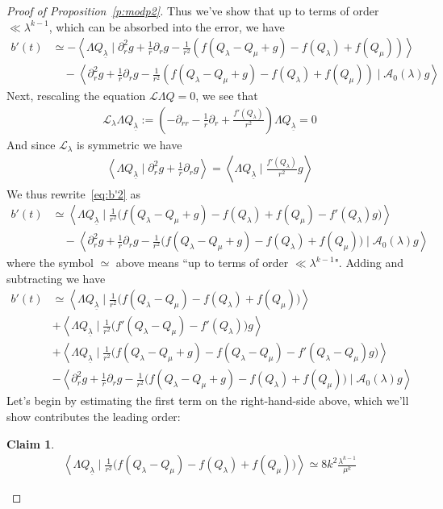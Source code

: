 \documentclass[10pt,reqno]{amsart}
\newcommand{\A}{\mathcal{A}}
\newcommand{\LL}{\mathcal{L}}
\newcommand{\la}{\lambda}
\newcommand{\La}{\Lambda}
\newcommand{\p}{\partial}
\newcommand{\ang}[1]{\left\langle{#1}\right\rangle}
\newcommand{\EQ}[1]{\begin{equation}\begin{split} #1 \end{split}\end{equation}}
\numberwithin{equation}{section}
\newtheorem{claim}[thm]{Claim}
\theoremstyle{remark}
\newcommand{\ula}{\underline{\lambda}}
\newcommand{\0}{\emptyset}
\begin{document}
\begin{proof}[Proof of Proposition~\ref{p:modp2}]
Thus we've show that up to terms of order $\ll \la^{k-1}$, which can be absorbed into the error,  we have 
\EQ{ \label{eq:b'2}
b'(t) & \simeq   -  \ang{ \La Q_{\ula} \mid  \p_r^2 g + \frac{1}{r} \p_r g  - \frac{1}{r^2} \left( f( Q_\la - Q_\mu + g) - f(Q_\la) + f(Q_\mu)\right)} \\
& \quad - \ang{ \p_r^2 g + \frac{1}{r} \p_r g  - \frac{1}{r^2} \left( f( Q_\la - Q_\mu + g) - f(Q_\la) + f(Q_\mu)\right) \mid \A_0(\la) g}  
}
Next, rescaling the equation $\LL \La Q = 0$, we see that 
\EQ{
 \LL_\la \La Q_{\ula} := (- \p_{rr} - \frac{1}{r} \p_r + \frac{f'(Q_\la)}{r^2}) \La Q_{\ula} = 0 
}
And since $\LL_{\la}$ is symmetric we have 
\EQ{
 \ang{ \La Q_{\ula} \mid  \p_r^2 g + \frac{1}{r} \p_r g } =  \ang{ \La Q_{\ula} \mid \frac{f'(Q_\la)}{r^2} g}
}
We thus rewrite~\eqref{eq:b'2} as 
\EQ{ \label{eq:b'3} 
b'(t) & \simeq     \ang{ \La Q_{\ula} \mid  \frac{1}{r^2} \Big( f( Q_\la - Q_\mu + g) - f(Q_\la) + f(Q_\mu)- f'(Q_\la)g\Big)} \\
& \quad - \ang{ \p_r^2 g + \frac{1}{r} \p_r g  - \frac{1}{r^2} \Big( f( Q_\la - Q_\mu + g) - f(Q_\la) + f(Q_\mu)\Big) \mid \A_0(\la) g}  
}
where the symbol $\simeq$ above means ``up to terms of order $\ll \la^{k-1}$". %
Adding and subtracting we have 
\begin{align}  \label{eq:lead3}
b'(t)  &\simeq 
 \ang{ \La Q_{\ula} \mid \frac{1}{r^2}  \Big( f(Q_{\la} - Q_\mu) - f(Q_\la) + f(Q_\mu) \Big)} \\ 
  &+  \ang{ \La Q_{\ula} \mid \frac{1}{r^2} \Big( f'(Q_\la - Q_\mu) - f'(Q_\la) \Big) g}  \label{eq:2ndterm} \\ 
& +  \ang{ \La Q_{\ula} \mid \frac{1}{r^2} \Big( f(Q_\la - Q_\mu + g) - f(Q_\la - Q_\mu) - f'(Q_\la - Q_\mu) g \Big)} \label{eq:3rdterm}  \\
 & - \ang{ \p_r^2 g + \frac{1}{r} \p_r g  - \frac{1}{r^2} \Big( f( Q_\la - Q_\mu + g) - f(Q_\la) + f(Q_\mu)\Big) \mid \A_0(\la) g}  \label{eq:4thterm}
\end{align}
Let's begin by estimating the first term on the right-hand-side above, which we'll show contributes the leading order: 
\begin{claim} \label{c:lead} 
\EQ{
\ang{ \La Q_{\ula} \mid \frac{1}{r^2}  \Big( f(Q_{\la} - Q_\mu) - f(Q_\la) + f(Q_\mu) \Big)}  \simeq 8k^2 \frac{\la^{k-1}}{\mu^k}
}

\end{claim}
\end{proof}
\end{document}
